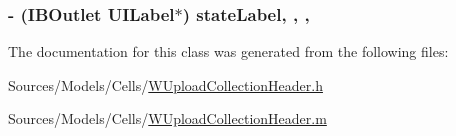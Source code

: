 \hypertarget{interface_w_upload_collection_header_abb3b1f97fccd1b14a009553b08d17ca6}{
\subsubsection[{state\-Label}]{\setlength{\rightskip}{0pt plus 5cm}-\/ (I\-B\-Outlet U\-I\-Label$\ast$) state\-Label\hspace{0.3cm}{\ttfamily [read]}, {\ttfamily [write]}, {\ttfamily [nonatomic]}, {\ttfamily [retain]}}}\label{interface_w_upload_collection_header_abb3b1f97fccd1b14a009553b08d17ca6}


The documentation for this class was generated from the following files\-:\begin{DoxyCompactItemize}
\item 
Sources/\-Models/\-Cells/\hyperlink{_w_upload_collection_header_8h}{W\-Upload\-Collection\-Header.\-h}\item 
Sources/\-Models/\-Cells/\hyperlink{_w_upload_collection_header_8m}{W\-Upload\-Collection\-Header.\-m}\end{DoxyCompactItemize}
